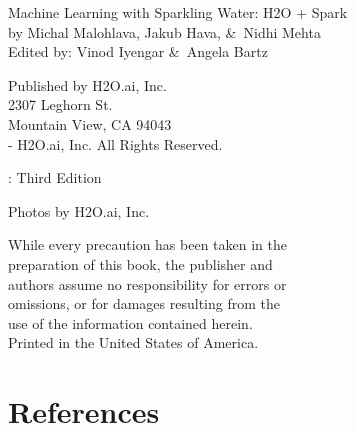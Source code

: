     {\raggedright\vfill

    Machine Learning with Sparkling Water: H2O + Spark\\
    by Michal Malohlava, Jakub Hava, \&\ Nidhi Mehta\\
    Edited by: Vinod Iyengar \&\ Angela Bartz

    \bigskip
    Published by H2O.ai, Inc. \\
    2307 Leghorn St. \\
    Mountain View, CA 94043\\
    \bigskip
    -\the\year \hspace{1pt} H2O.ai, Inc. All Rights Reserved.
    \bigskip

    \monthname \hspace{1pt}  \the\year: Third Edition
    \bigskip

    Photos by \textcopyright H2O.ai, Inc.
    \bigskip

    While every precaution has been taken in the\\
    preparation of this book, the publisher and\\
    authors assume no responsibility for errors or\\
    omissions, or for damages resulting from the\\
    use of the information contained herein.\\
    \bigskip
    Printed in the United States of America.


    }\par

    \newpage
    \tableofcontents

    \newpage
    

    \newpage
    

    \newpage
    

    \newpage
    

    \newpage
    

    \newpage
    

    \newpage
    

    \newpage
    

    \newpage
    

    \newpage
    

    \newpage
    

    \newpage
    

    \newpage


    \section{References}

    


